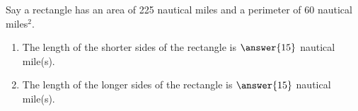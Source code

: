 \documentclass{ximera}
\author{Kenneth Berglund}
\begin{document}
\begin{exercise}
Say a rectangle has an area of 225 nautical miles and a perimeter of 60 nautical miles$^2$.  

\begin{enumerate}
\item The length of the shorter sides of the rectangle is $\answer{15}$ nautical mile(s).
\item The length of the longer sides of the rectangle is $\answer{15}$ nautical mile(s).
\end{enumerate}

\end{exercise}
\end{document}
